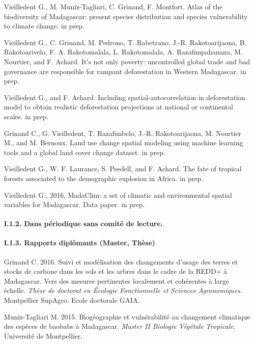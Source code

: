 \documentclass[12pt,]{article}
\let\oldparagraph\paragraph
\renewcommand{\paragraph}[1]{\oldparagraph{#1}\mbox{}}
\begin{document}
Vieilledent G., M. Muniz-Tagliari, C. Grinand, F. Montfort. Atlas of the
biodiversity of Madagascar: present species distribution and species
vulnerability to climate change. in prep.

Vieilledent G., C. Grinand, M. Pedrono, T. Rabetrano, J.-R.
Rakotoarijaona, B. Rakotoarivelo, F. A. Rakotomalala, L. Rakotomalala,
A. Razafimpahanana, M. Nourtier, and F. Achard. It's not only poverty:
uncontrolled global trade and bad governance are responsible for rampant
deforestation in Western Madagascar. in prep.

Vieilledent G., and F. Achard. Including spatial-autocorrelation in
deforestation model to obtain realistic deforestation projections at
national or continental scales. in prep.

Grinand C., G. Vieilledent, T. Razafimbelo, J.-R. Rakotoarijaona, M.
Nourtier M., and M. Bernoux. Land use change spatial modeling using
machine learning tools and a global land cover change dataset. in prep.

Vieilledent G., W. F. Laurance, S. Peedell, and F. Achard. The fate of
tropical forests associated to the demographic explosion in Africa. in
prep.

Vieilledent G., 2016. MadaClim: a set of climatic and environmental
spatial variables for Madagascar. Data paper. in prep.

\hypertarget{i.1.2.-dans-periodique-sans-comite-de-lecture.}{%
\paragraph{I.1.2. Dans périodique sans comité de
lecture.}\label{i.1.2.-dans-periodique-sans-comite-de-lecture.}}

\hypertarget{i.1.3.-rapports-diplomants-master-these}{%
\paragraph{I.1.3. Rapports diplômants (Master,
Thèse)}\label{i.1.3.-rapports-diplomants-master-these}}

Grinand C. 2016. Suivi et modélisation des changements d'usage des
terres et stocks de carbone dans les sols et les arbres dans le cadre de
la REDD+ à Madagascar. Vers des mesures pertinentes localement et
cohérentes à large échelle. \emph{Thèse de doctorat en Écologie
Fonctionnelle et Sciences Agronomiques.} Montpellier SupAgro. Ecole
doctorale GAIA.

Muniz-Tagliari M. 2015. Biogéographie et vulnérabilité au changement
climatique des espèces de baobabs à Madagascar. \emph{Master II Biologie
Végétale Tropicale.} Université de Montpellier.
\end{document}
